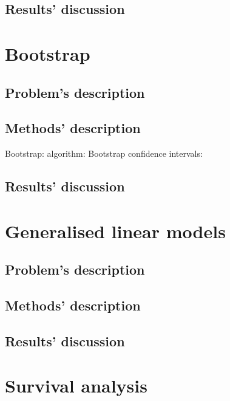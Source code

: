 \documentclass{report}
\begin{document}
\section{Results' discussion}


\chapter{Bootstrap}
\section{Problem's description}

\section{Methods' description}
Bootstrap:
algorithm:
Bootstrap confidence intervals:


\section{Results' discussion}


\chapter{Generalised linear models}
\section{Problem's description}

\section{Methods' description}

\section{Results' discussion}


\chapter{Survival analysis}
\end{document}
